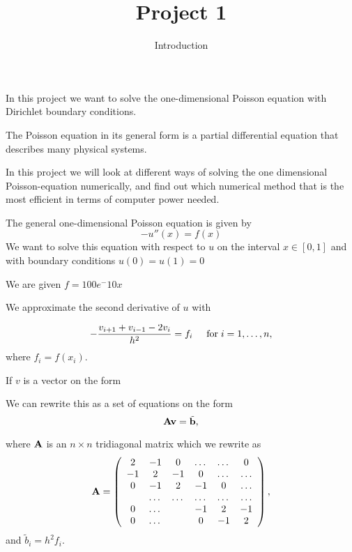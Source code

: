 \documentclass[12pt]{article}
\begin{document}
\title{Project 1}
\maketitle

\subtitle{Introduction}

In this project we want to solve the one-dimensional Poisson equation with Dirichlet boundary conditions. 

The Poisson equation  in its general form is a  partial differential equation that describes many physical systems. 

In this project we will look at different ways of solving the one dimensional Poisson-equation numerically, and find out which numerical method that is the most efficient in terms of computer power needed. 

The general one-dimensional Poisson equation is given by 
\begin{equation}
-u''(x) = f(x)
\end{equation}
We want to solve this equation with respect to $u$ on the interval $x \in [0,1]$ and with boundary conditions $u(0) = u(1) = 0$

We are given $f  = 100e^-10x$ 

We  approximate the second
derivative of $u$ with 


\[
   -\frac{v_{i+1}+v_{i-1}-2v_i}{h^2} = f_i  \hspace{0.5cm} \mathrm{for} \hspace{0.1cm} i=1,\dots, n,
\]
where $f_i=f(x_i)$.



If $v$ is a vector on the form 


We can rewrite this as a set of equations on the form \[
   {\bf A}{\bf v} = \tilde{{\bf b}},
\]

where ${\bf A}$ is an $n\times n$  tridiagonal matrix which we rewrite as 
\begin{equation}
    {\bf A} = \left(\begin{array}{cccccc}
                           2& -1& 0 &\dots   & \dots &0 \\
                           -1 & 2 & -1 &0 &\dots &\dots \\
                           0&-1 &2 & -1 & 0 & \dots \\
                           & \dots   & \dots &\dots   &\dots & \dots \\
                           0&\dots   &  &-1 &2& -1 \\
                           0&\dots    &  & 0  &-1 & 2 \\
                      \end{array} \right),
\end{equation}
and $\tilde{b}_i=h^2f_i$.
\end{document}
